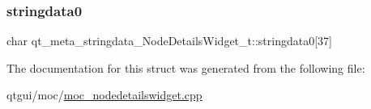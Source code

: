 \subsubsection{\texorpdfstring{stringdata0}{stringdata0}}
{\footnotesize\ttfamily char qt\+\_\+meta\+\_\+stringdata\+\_\+\+Node\+Details\+Widget\+\_\+t\+::stringdata0\mbox{[}37\mbox{]}}



The documentation for this struct was generated from the following file\+:\begin{DoxyCompactItemize}
\item 
qtgui/moc/\mbox{\hyperlink{moc__nodedetailswidget_8cpp}{moc\+\_\+nodedetailswidget.\+cpp}}\end{DoxyCompactItemize}
